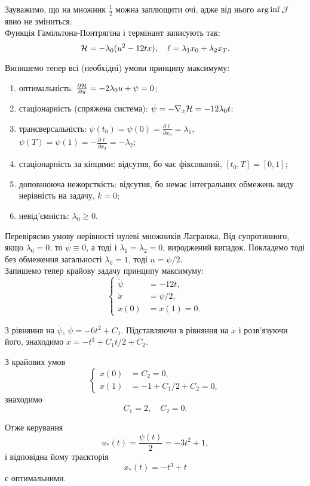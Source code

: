 \begin{solution}
	Зауважимо, що на множник $\frac{1}{2}$ можна заплющити очі, адже від нього $\arg\inf\mathcal{J}$ явно не зміниться. \\

	Функція Гамільтона-Понтрягіна і термінант записують так: \[ \mathcal{H} = - \lambda_0 (u^2 - 12 t x), \quad \ell = \lambda_1 x_0 + \lambda_2 x_T. \]

	Випишемо тепер всі (необхідні) умови принципу максимуму:
	\begin{enumerate}
		\item оптимальність: $\frac{\partial \mathcal{H}}{\partial u} = - 2 \lambda_0 u + \psi  = 0$;
		\item стаціонарність (спряжена система): $\dot \psi = - \nabla_x \mathcal{H} = - 12 \lambda_0 t$;
		\item трансверсальність: $\psi(t_0) = \psi(0) = \frac{\partial \ell}{\partial x_0} = \lambda_1$, $\psi(T) = \psi(1) = - \frac{\partial \ell}{\partial x_T} = - \lambda_2$;
		\item стаціонарність за кінцями: відсутня, бо час фіксований, $[t_0,T]=[0,1]$;
		\item доповнююча нежорсткість: відсутня, бо немає інтегральних обмежень виду нерівність на задачу, $k = 0$;
		\item невід'ємність: $\lambda_0 \ge 0$.
	\end{enumerate}

	Перевіряємо умову нерівності нулеві множників Лагранжа. Від супротивного, якщо $\lambda_0 = 0$, то $\psi \equiv 0$, а тоді і $\lambda_1 = \lambda_2 = 0$, вироджений випадок. Покладемо тоді без обмеження загальності $\lambda_0 = 1$, тоді $u = \psi / 2$. \\

	Запишемо тепер крайову задачу принципу максимуму: \[ \left\{ \begin{aligned}
		\dot \psi &= -12t, \\
		\dot x &= \psi / 2, \\
		x(0) &= x(1) = 0.
	\end{aligned} \right. \]

	З рівняння на $\dot \psi$, $\psi = - 6 t^2 + C_1$. Підставляючи в рівняння на $\dot x$ і розв'язуючи його, знаходимо $x = - t^3 + C_1 t / 2 + C_2$.

	З крайових умов \[ \left\{ \begin{aligned}
		x(0) &= C_2 = 0, \\
		x(1) &= -1 + C_1 / 2 + C_2 = 0,
	\end{aligned} \right. \] знаходимо \[C_1 = 2, \quad C_2 = 0. \]

	Отже керування \[ u_*(t) = \frac{\psi(t)}{2} = - 3 t^2 + 1, \] і відповідна йому траєкторія \[ x_*(t) = -t^3 + t \] є оптимальними.

\end{solution}

